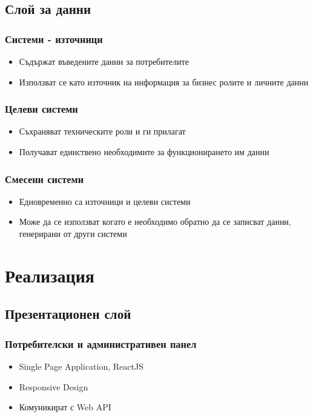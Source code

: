 \documentclass[bulgarian,a4paper,12pt,titlepage]{article}
\begin{document}
        \subsection{Слой за данни}
            \subsubsection{Системи - източници}
                \begin{itemize}
                    \item Съдържат въведените данни за потребителите
                    \item Използват се като източник на информация за бизнес ролите и личните данни
                \end{itemize}
            \subsubsection{Целеви системи}
                \begin{itemize}
                    \item Съхраняват техническите роли и ги прилагат
                    \item Получават единствено необходимите за функционирането им данни
                \end{itemize}
            \subsubsection{Смесени системи}
                \begin{itemize}
                    \item Едновременно са източници и целеви системи
                    \item Може да се използват когато е необходимо обратно да се записват данни, генерирани от други системи
                \end{itemize}
    \section{Реализация}
    \subsection{Презентационен слой}
            \subsubsection{Потребителски и административен панел}
                \begin{itemize}
                    \item Single Page Application, ReactJS
                    \item Responsive Design
                    \item Комуникират с Web API
                \end{itemize}
\end{document}
